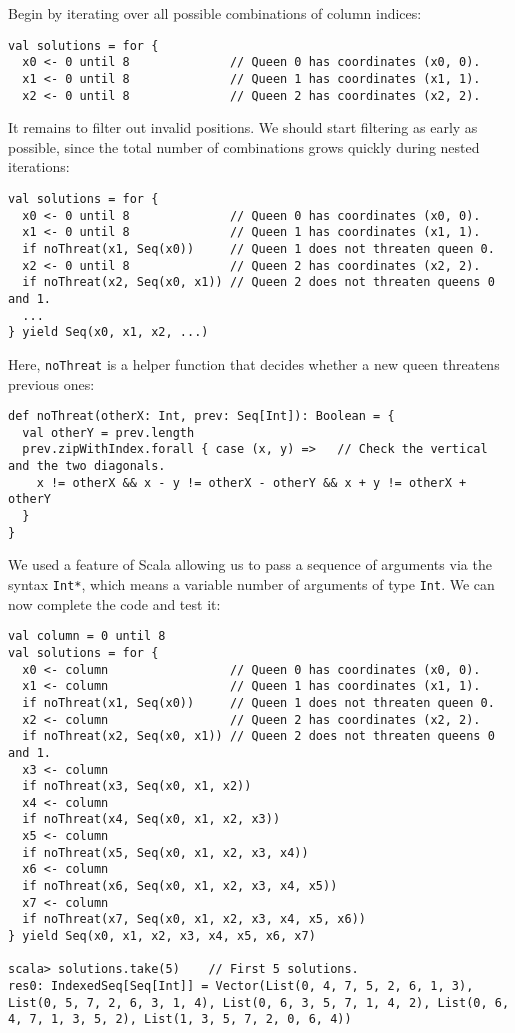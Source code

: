 Begin by iterating over all possible combinations of column indices:
\begin{lstlisting}
val solutions = for {
  x0 <- 0 until 8              // Queen 0 has coordinates (x0, 0).
  x1 <- 0 until 8              // Queen 1 has coordinates (x1, 1).
  x2 <- 0 until 8              // Queen 2 has coordinates (x2, 2).
\end{lstlisting}
It remains to filter out invalid positions. We should start filtering
as early as possible, since the total number of combinations grows
quickly during nested iterations:
\begin{lstlisting}
val solutions = for {
  x0 <- 0 until 8              // Queen 0 has coordinates (x0, 0).
  x1 <- 0 until 8              // Queen 1 has coordinates (x1, 1).
  if noThreat(x1, Seq(x0))     // Queen 1 does not threaten queen 0.
  x2 <- 0 until 8              // Queen 2 has coordinates (x2, 2).
  if noThreat(x2, Seq(x0, x1)) // Queen 2 does not threaten queens 0 and 1.
  ...
} yield Seq(x0, x1, x2, ...)
\end{lstlisting}
Here, \lstinline!noThreat! is a helper function that decides whether
a new queen threatens previous ones:
\begin{lstlisting}
def noThreat(otherX: Int, prev: Seq[Int]): Boolean = {
  val otherY = prev.length
  prev.zipWithIndex.forall { case (x, y) =>   // Check the vertical and the two diagonals.
    x != otherX && x - y != otherX - otherY && x + y != otherX + otherY
  }
}
\end{lstlisting}
We used a feature of Scala allowing us to pass a sequence of arguments
via the syntax \lstinline!Int*!, which means a variable number of
arguments of type \lstinline!Int!. We can now complete the code and
test it:
\begin{lstlisting}
val column = 0 until 8
val solutions = for {
  x0 <- column                 // Queen 0 has coordinates (x0, 0).
  x1 <- column                 // Queen 1 has coordinates (x1, 1).
  if noThreat(x1, Seq(x0))     // Queen 1 does not threaten queen 0.
  x2 <- column                 // Queen 2 has coordinates (x2, 2).
  if noThreat(x2, Seq(x0, x1)) // Queen 2 does not threaten queens 0 and 1.
  x3 <- column
  if noThreat(x3, Seq(x0, x1, x2))
  x4 <- column
  if noThreat(x4, Seq(x0, x1, x2, x3))
  x5 <- column
  if noThreat(x5, Seq(x0, x1, x2, x3, x4))
  x6 <- column
  if noThreat(x6, Seq(x0, x1, x2, x3, x4, x5))
  x7 <- column
  if noThreat(x7, Seq(x0, x1, x2, x3, x4, x5, x6))
} yield Seq(x0, x1, x2, x3, x4, x5, x6, x7)

scala> solutions.take(5)    // First 5 solutions.
res0: IndexedSeq[Seq[Int]] = Vector(List(0, 4, 7, 5, 2, 6, 1, 3), List(0, 5, 7, 2, 6, 3, 1, 4), List(0, 6, 3, 5, 7, 1, 4, 2), List(0, 6, 4, 7, 1, 3, 5, 2), List(1, 3, 5, 7, 2, 0, 6, 4))
\end{lstlisting}


